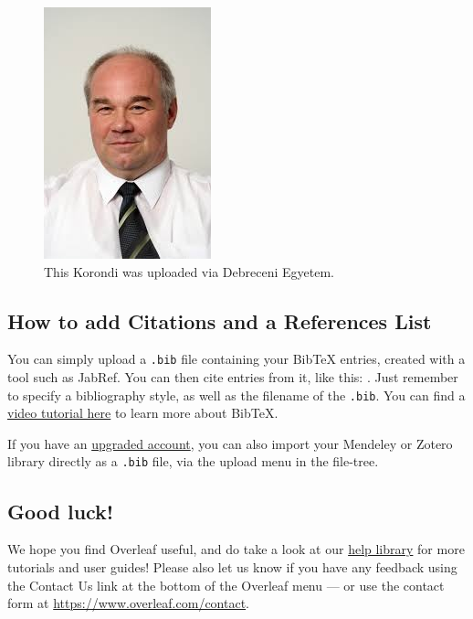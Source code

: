 \documentclass{article}
\begin{document}
\begin{figure}
\centering
\includegraphics[width=0.25\linewidth]{korondiP.jpg}
\caption{\label{fig:korondi}This Korondi was uploaded via Debreceni Egyetem.}
\end{figure}

\subsection{How to add Citations and a References List}

You can simply upload a \verb|.bib| file containing your BibTeX entries, created with a tool such as JabRef. You can then cite entries from it, like this: \cite{greenwade93}. Just remember to specify a bibliography style, as well as the filename of the \verb|.bib|. You can find a \href{https://www.overleaf.com/help/97-how-to-include-a-bibliography-using-bibtex}{video tutorial here} to learn more about BibTeX.

If you have an \href{https://www.overleaf.com/user/subscription/plans}{upgraded account}, you can also import your Mendeley or Zotero library directly as a \verb|.bib| file, via the upload menu in the file-tree.

\subsection{Good luck!}

We hope you find Overleaf useful, and do take a look at our \href{https://www.overleaf.com/learn}{help library} for more tutorials and user guides! Please also let us know if you have any feedback using the Contact Us link at the bottom of the Overleaf menu --- or use the contact form at \url{https://www.overleaf.com/contact}.



\end{document}
